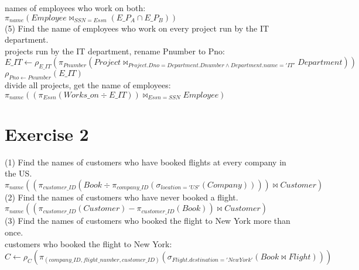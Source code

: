 \documentclass[]{article}
\begin{document}
	names of employees who work on both:\\
	
	$\pi_{name}(Employee\bowtie_{SSN=Essn}(E\_P_{A}\cap E\_P_{B}))$\\
	
	\noindent(5) Find the name of employees who work on every project run by the IT department.\\
	
	projects run by the IT department, rename Pnumber to Pno:\\
	
	$E\_IT\leftarrow \rho_{E\_IT}(\pi_{Pnumber}(Project\bowtie_{Project.Dno=Department.Dnumber\wedge Department.name='IT'} Department))$\\
	
	$\rho_{Pno\leftarrow Pnumber}(E\_IT)$\\
	
	divide all projects, get the name of employees:\\
	
	$\pi_{name}((\pi_{Essn}(Works\_on\div E\_IT))\bowtie_{Essn=SSN} Employee)$\\
	
	
	\clearpage
	\section{Exercise 2}
	
	\noindent(1)  Find the names of customers who have booked flights at every company in the US.\\
	
	$\pi_{name}((\pi_{customer\_ID}(Book\div \pi_{company\_ID}(\sigma_{location='US'}(Company))))\bowtie Customer)$\\
	
	\noindent(2) Find the names of customers who have never booked a flight.\\
	
	$\pi_{name}((\pi_{customer\_ID}(Customer)- \pi_{customer\_ID}(Book))\bowtie Customer)$\\

	\noindent(3) Find the names of customers who booked the flight to New York more than once.\\
	
	customers who booked the flight to New York:\\
	
	$C\leftarrow \rho_{C}(\pi_{(company\_ID,flight\_number,customer\_ID)}(\sigma_{Flight.destination='New York'}(Book\bowtie Flight)))$\\
	
\end{document}
